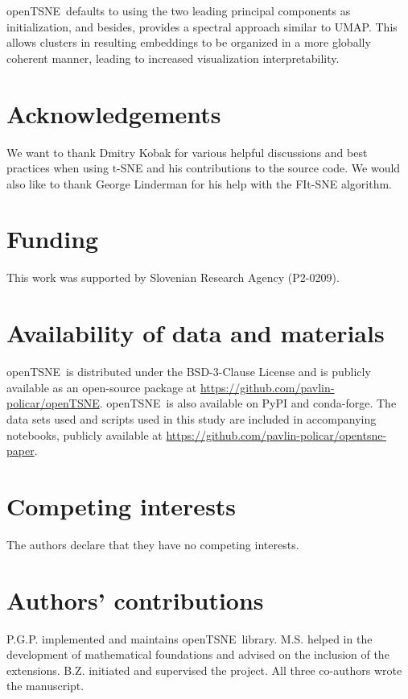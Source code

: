 \documentclass[twocolumn]{bmcart}
\newcommand{\opentsne}{\textsf{openTSNE}}
\begin{document}
\opentsne\ defaults to using the two leading principal components as
initialization, and besides, provides a spectral approach similar to
UMAP. This allows clusters in resulting embeddings to be organized in
a more globally coherent manner, leading to increased visualization
interpretability.


\begin{backmatter}

\section*{Acknowledgements}
We want to thank Dmitry Kobak for various helpful discussions and best practices
when using t-SNE and his contributions to the source code. We would also
like to thank George Linderman for his help with the FIt-SNE algorithm.

\section*{Funding}
This work was supported by Slovenian Research Agency (P2-0209).

\section*{Availability of data and materials}
\opentsne\ is distributed under the BSD-3-Clause License and is publicly
available as an open-source package at
\url{https://github.com/pavlin-policar/openTSNE}. \opentsne\ is also available
on \textsf{PyPI} and \textsf{conda-forge}. The data sets used and scripts used
in this study are included in accompanying notebooks, publicly available at
\url{https://github.com/pavlin-policar/opentsne-paper}.

\section*{Competing interests}
The authors declare that they have no competing interests.

\section*{Authors' contributions}
P.G.P. implemented and maintains \opentsne\ library. M.S. helped in the development of mathematical foundations and advised on the inclusion of the extensions. B.Z. initiated and supervised the project. All three co-authors wrote the manuscript.



\end{backmatter}
\end{document}
